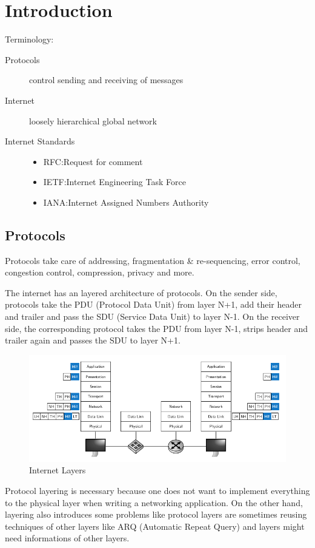 
\section{Introduction}
Terminology:
\begin{description}
  \item[Protocols] control sending and receiving of messages
  \item[Internet] loosely hierarchical global network
  \item[Internet Standards]
    \begin{itemize}
      \item RFC:\@ Request for comment
      \item IETF:\@ Internet Engineering Task Force
      \item IANA:\@ Internet Assigned Numbers Authority
    \end{itemize}
\end{description}

\subsection{Protocols}
Protocols take care of addressing, fragmentation \& re-sequencing, error control, congestion control, compression, privacy and more.

The internet has an layered architecture of protocols.
On the sender side, protocols take the PDU (Protocol Data Unit) from layer N+1, add their header and trailer and pass the SDU (Service Data Unit) to layer N-1.
On the receiver side, the corresponding protocol takes the PDU from layer N-1, strips header and trailer again and passes the SDU to layer N+1.
\begin{figure}[H]
  \centering
  \includegraphics[width=.6\textwidth]{figures/internet_layering.png}
  \caption{Internet Layers}
\end{figure}

Protocol layering is necessary because one does not want to implement everything to the physical layer when writing a networking application.
On the other hand, layering also introduces some problems like protocol layers are sometimes reusing techniques of other layers like ARQ (Automatic Repeat Query) and layers might need informations of other layers.

